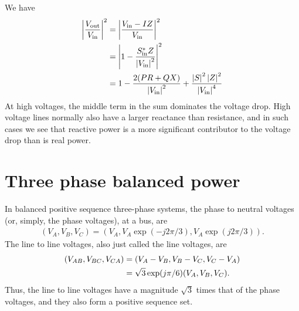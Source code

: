 \documentclass[10pt]{article}
\begin{document}
We have
\begin{align}
	\left|\frac{V_\text{out}}{V_\text{in}}\right|^2 &= \left|\frac{V_\text{in} - IZ}{V_\text{in}}\right|^2 \notag \\
	&= \left|1 - \frac{S^*_\text{in}Z}{\left|V_\text{in}\right|^2}\right|^2 \notag \\
	&= 1 - \frac{2(PR + QX)}{\left|V_\text{in}\right|^2} + \frac{\left|S\right|^2\left|Z\right|^2}{\left|V_\text{in}\right|^4}
\end{align}
At high voltages, the middle term in the sum dominates the voltage drop. High voltage lines normally also have a larger reactance than resistance, and in such cases we see that reactive power is a more significant contributor to the voltage drop than is real power.
\section{Three phase balanced power}
In balanced positive sequence three-phase systems, the phase to neutral voltages (or, simply, the phase voltages), at a bus, are 
\begin{align}
(V_A, V_B, V_C) = (V_A, V_A\exp(-j2\pi/3), V_A\exp(j2\pi/3)).
\end{align}
The line to line voltages, also just called the line voltages, are 
\begin{align}
(V_{AB}, V_{BC}, V_{CA}) &= (V_A - V_B, V_B - V_C, V_C - V_A) \notag \\
&= \sqrt{3}\exp(j\pi/6)(V_A, V_B, V_C).
\end{align}
Thus, the line to line voltages have a magnitude $\sqrt{3}$ times that of the phase voltages, and they also form a positive sequence set.
\end{document}
